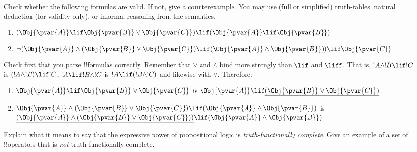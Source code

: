 \documentclass[../../../include/open-logic-section]{subfiles}
\begin{document}


\begin{prob}
    Check whether the following formulas are valid. If not, give a counterexample.
    You may use (full or simplified) truth-tables, natural deduction (for
    validity only), or informal reasoning from the semantics.

    \begin{enumerate}
    \item $(\Obj{\pvar{A}}\lif \Obj{\pvar{B}}\lor \Obj{\pvar{C}})\lif(\Obj{\pvar{A}}\lif \Obj{\pvar{B}})$
    \item $\lnot(\Obj{\pvar{A}}\land(\Obj{\pvar{B}}\lor \Obj{\pvar{C}})\lif(\Obj{\pvar{A}}\land \Obj{\pvar{B}}))\lif \Obj{\pvar{C}}$
    \end{enumerate}

    \begin{ans}
        Check first that you parse !!{formula}s correctly. Remember
        that $\lor$ and $\land$ bind more strongly than $\lif$ and
        $\liff$. That is, $!A\land !B\lif !C$ is $(!A\land !B)\lif !C$,
        $!A\lif!B\land!C$ is $!A\lif(!B\land!C)$ and likewise with $\lor$.
        Therefore:
        \begin{enumerate}
        \item $\Obj{\pvar{A}}\lif \Obj{\pvar{B}}\lor \Obj{\pvar{C}}$
        is  $\Obj{\pvar{A}}\lif \underline{(\Obj{\pvar{B}}\lor \Obj{\pvar{C}})}$.
        \item $\Obj{\pvar{A}}\land(\Obj{\pvar{B}}\lor
        \Obj{\pvar{C}})\lif(\Obj{\pvar{A}}\land \Obj{\pvar{B}})$ is
        $\underline{(\Obj{\pvar{A}}\land(\Obj{\pvar{B}}\lor
        \Obj{\pvar{C}}))}\lif(\Obj{\pvar{A}}\land \Obj{\pvar{B}})$
        \end{enumerate}

    \end{ans}
\end{prob}

\begin{prob}
    Explain what it means to say that the expressive power of 
    propositional logic is \emph{truth-functionally complete}.
    Give an example of a set of !!{operator}s that is \emph{not}
    truth-functionally complete.
\end{prob}
\end{document}
